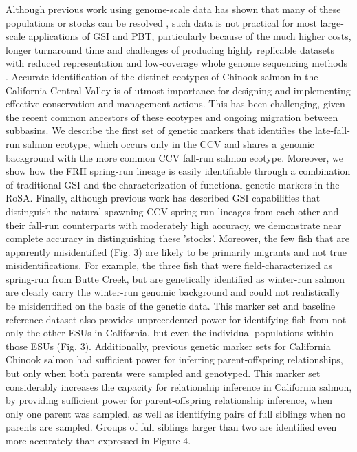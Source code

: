 Although previous work using genome-scale data has shown that many of these populations or stocks can be resolved \cite{thompson2020complex,meek2020identifying},
such data is not practical for most large-scale applications of GSI and PBT, particularly because
of the much higher costs, longer turnaround time and challenges of producing highly
replicable datasets with reduced representation and low-coverage whole genome sequencing methods \cite{ali2016rad}.
Accurate identification of the distinct ecotypes of Chinook salmon in the California Central Valley is of utmost importance for designing and implementing effective conservation and management actions. This has been challenging, given the recent common ancestors of these ecotypes and ongoing migration between subbasins. We describe the first set of genetic markers that identifies the late-fall-run salmon ecotype, which occurs only in the CCV and shares a genomic background with the more common CCV fall-run salmon ecotype. Moreover, we show how the FRH spring-run lineage is easily identifiable through a combination of traditional GSI and the characterization of functional genetic markers in the RoSA. Finally, although previous work has described GSI capabilities that distinguish the natural-spawning CCV spring-run lineages from each other and their fall-run counterparts with moderately high accuracy, we demonstrate near complete accuracy in distinguishing these 'stocks'. Moreover, the few fish that are apparently misidentified (Fig. 3) are likely to be primarily migrants and not true misidentifications. For example, the three fish that were field-characterized as spring-run from Butte Creek, but are genetically identified as winter-run salmon are clearly carry the winter-run genomic background and could not realistically be misidentified on the basis of the genetic data. This marker set and baseline reference dataset also provides unprecedented power for identifying fish from not only the other ESUs in California, but even the individual populations within those ESUs (Fig. 3).
Additionally, previous genetic marker sets for California Chinook salmon had sufficient power for inferring parent-offspring relationships, but only when both parents were sampled and genotyped. This marker set considerably increases the capacity for relationship inference in California salmon, by providing sufficient power for parent-offspring relationship inference, when only one parent was sampled, as well as identifying pairs of full siblings when no parents are sampled. Groups of full siblings larger than two are identified even more accurately than expressed in Figure 4.

